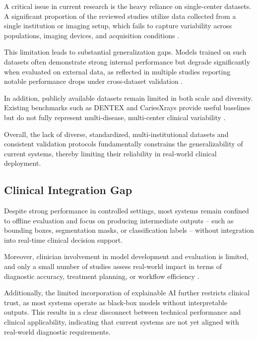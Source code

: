 \documentclass[conference]{IEEEtran}
\begin{document}
A critical issue in current research is the heavy reliance on
single-center datasets. A significant proportion of the reviewed studies
utilize data collected from a single institution or imaging setup, which
fails to capture variability across populations, imaging devices, and
acquisition conditions \cite{albano2024artificial,luke2025accuracy}.

This limitation leads to substantial generalization gaps. Models trained
on such datasets often demonstrate strong internal performance but
degrade significantly when evaluated on external data, as reflected in
multiple studies reporting notable performance drops under cross-dataset
validation \cite{muresanu2024automating}.

In addition, publicly available datasets remain limited in both scale
and diversity. Existing benchmarks such as DENTEX and CariesXrays
provide useful baselines but do not fully represent multi-disease,
multi-center clinical variability \cite{nassiri2025yolo,chen2024cariesxrays}.

Overall, the lack of diverse, standardized, multi-institutional datasets
and consistent validation protocols fundamentally constrains the
generalizability of current systems, thereby limiting their reliability
in real-world clinical deployment.

\subsection{Clinical Integration Gap}

Despite strong performance in controlled settings, most systems remain
confined to offline evaluation and focus on producing intermediate
outputs -- such as bounding boxes, segmentation masks, or classification
labels -- without integration into real-time clinical decision support.

Moreover, clinician involvement in model development and evaluation is
limited, and only a small number of studies assess real-world impact in
terms of diagnostic accuracy, treatment planning, or workflow efficiency
\cite{schwendicke2021cost,lee2025evaluation}.

Additionally, the limited incorporation of explainable AI further
restricts clinical trust, as most systems operate as black-box models
without interpretable outputs. This results in a clear disconnect
between technical performance and clinical applicability, indicating
that current systems are not yet aligned with real-world diagnostic
requirements.
\end{document}

